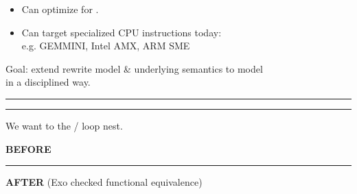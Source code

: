 \begin{center}
{\large
\begin{tikzpicture}[node distance=8mm]

\end{tikzpicture}
}
\end{center}

{\LARGE
\begin{itemize}
  \item Can optimize for .
  \item Can target specialized CPU instructions today:\\e.g. GEMMINI, Intel AMX, ARM SME
\end{itemize}
Goal: extend rewrite model \& underlying semantics to model\\ in a disciplined way.

}
\vfill
\hrule
{\large

}


\newpage
{}

{\large

}

\vspace{3mm}
\hrule

{\LARGE
We want to  the / loop nest.

}


\newpage
{}

{\large

}

\newpage
{}

{\large

}

\newpage
{}

{\large

}

\newpage
{}

{\large

}

\newpage
{}

{\large

}

\newpage
{\large
\textbf{\LARGE BEFORE}\\

}

\vspace{1mm}
\hrule

{\large
{\LARGE \textbf{AFTER} (Exo checked functional equivalence)}\\

}

